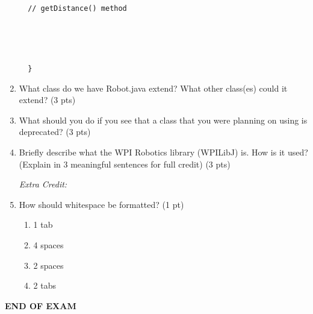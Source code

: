 \documentclass[11pt,fleqn]{article}
\begin{document}
\begin{enumerate}
\begin{verbatim}
  // getDistance() method





  }
  \end{verbatim}

\item What class do we have Robot.java extend? What other class(es) could it extend? (3 pts)


\vspace{32ex}


\newpage

\item What should you do if you see that a class that you were planning on using is deprecated? (3 pts)

\vspace{32ex}

\item Briefly describe what the WPI Robotics library (WPILibJ\textsuperscript\textregistered) is. How is it used? (Explain in 3 meaningful sentences for full credit) (3 pts)


\vspace{32ex}


\textit{Extra Credit:}
    \item How should whitespace be formatted? (1 pt)
	\begin{enumerate}
	\item 1 tab
	\item 4 spaces
	\item 2 spaces
	\item 2 tabs
	\end{enumerate}

\end{enumerate}
\vfill
	\begin{center}
		\textbf{END OF EXAM}
	\end{center}
\end{document}
